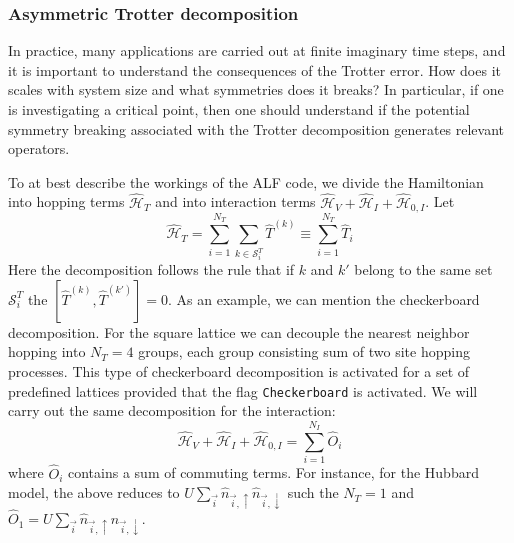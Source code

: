 \subsubsection{ Asymmetric  Trotter decomposition }
In practice, many applications are carried out at finite  imaginary time steps,  and it is important to  understand the consequences of the Trotter error.   How does it scales with system size and  what  symmetries  does it  breaks?   In particular, if  one is investigating a critical  point, then one should understand  if the potential symmetry breaking  associated  with the Trotter decomposition   generates  relevant operators. 

To at best describe the workings of the ALF  code,  we divide the Hamiltonian into  hopping terms  $\hat{\mathcal{H}}_{T}$  and into interaction terms  
$\hat{\mathcal{H}}_{V} +  \hat{\mathcal{H}}_{I}   +   \hat{\mathcal{H}}_{0,I} $.       Let 
\begin{equation}
	\hat{\mathcal{H}}_{T}     = \sum_{i=1}^{N_T} \sum_{k \in \mathcal{S}^{T}_i} \hat{T}^{(k)}  \equiv \sum_{i=1}^{N_T} \hat{T}_{i} 
\end{equation}
Here the decomposition follows the rule  that if $k$ and $k'$  belong to the same set $\mathcal{S}^{T}_i $ the   $ \left[ \hat{T}^{(k)} , \hat{T}^{(k')} \right] = 0 $.  As an 
example, we can mention the checkerboard decomposition.   For the square lattice we can decouple the nearest neighbor hopping  into $N_T=4$ groups,  each group consisting  sum  of two site hopping processes.    This type of checkerboard decomposition is activated for a set  of predefined lattices provided that the flag 
\texttt{Checkerboard}   is activated.     
We will carry out the same decomposition for the interaction: 
\begin{equation}
	\hat{\mathcal{H}}_{V}  +  \hat{\mathcal{H}}_{I}   +   \hat{\mathcal{H}}_{0,I}   = \sum_{i=1}^{N_I}  \hat{O}_{i}
\end{equation}
where $\hat{O}_{i}$  contains a sum of commuting terms.  For instance, for the Hubbard model,   the  above reduces to 
$U \sum_{\vec{i}}  \hat{n}_{\vec{i},\uparrow } \hat{n}_{\vec{i},\downarrow }  $    such the $N_T = 1$ and   $ \hat{O}_{1} = U \sum_{\vec{i}}  \hat{n}_{\vec{i},\uparrow } \hat{n}_{\vec{i},\downarrow }   $. 

